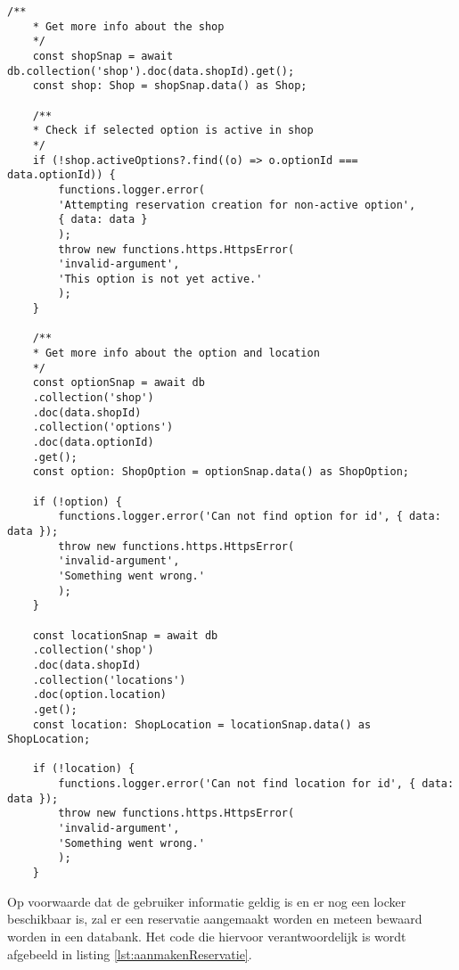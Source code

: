 \begin{lstlisting}[caption={Het informatie ophalen van de geselecteerde locatie. Aan de hand van geselecteerde evenement kan er gegevens uit de databank gehaald worden.}, label={lst:ophalenEventInfo}]
    /**
    * Get more info about the shop
    */
    const shopSnap = await db.collection('shop').doc(data.shopId).get();
    const shop: Shop = shopSnap.data() as Shop;
    
    /**
    * Check if selected option is active in shop
    */
    if (!shop.activeOptions?.find((o) => o.optionId === data.optionId)) {
        functions.logger.error(
        'Attempting reservation creation for non-active option',
        { data: data }
        );
        throw new functions.https.HttpsError(
        'invalid-argument',
        'This option is not yet active.'
        );
    }
    
    /**
    * Get more info about the option and location
    */
    const optionSnap = await db
    .collection('shop')
    .doc(data.shopId)
    .collection('options')
    .doc(data.optionId)
    .get();
    const option: ShopOption = optionSnap.data() as ShopOption;
    
    if (!option) {
        functions.logger.error('Can not find option for id', { data: data });
        throw new functions.https.HttpsError(
        'invalid-argument',
        'Something went wrong.'
        );
    }
    
    const locationSnap = await db
    .collection('shop')
    .doc(data.shopId)
    .collection('locations')
    .doc(option.location)
    .get();
    const location: ShopLocation = locationSnap.data() as ShopLocation;
    
    if (!location) {
        functions.logger.error('Can not find location for id', { data: data });
        throw new functions.https.HttpsError(
        'invalid-argument',
        'Something went wrong.'
        );
    }
\end{lstlisting}

Op voorwaarde dat de gebruiker informatie geldig is en er nog een locker beschikbaar is, zal er een reservatie aangemaakt worden en meteen bewaard worden in een databank. Het code die hiervoor verantwoordelijk is wordt afgebeeld in listing \ref{lst:aanmakenReservatie}.

